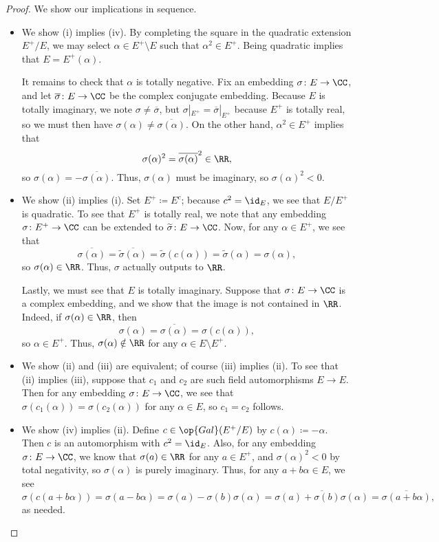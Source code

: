 \documentclass[../notes.tex]{subfiles}
\begin{document}
\begin{proof}
	We show our implications in sequence.
	\begin{itemize}
		\item We show (i) implies (iv). By completing the square in the quadratic extension $E^+/E$, we may select $\alpha\in E^+\setminus E$ such that $\alpha^2\in E^+$. Being quadratic implies that $E=E^+(\alpha)$.

		It remains to check that $\alpha$ is totally negative. Fix an embedding $\sigma\colon E\to\CC$, and let $\overline\sigma\colon E\to\CC$ be the complex conjugate embedding. Because $E$ is totally imaginary, we note $\sigma\ne\overline\sigma$, but $\sigma|_{E^+}=\overline\sigma|_{E^+}$ because $E^+$ is totally real, so we must then have $\sigma(\alpha)\ne\overline{\sigma(\alpha)}$. On the other hand, $\alpha^2\in E^+$ implies that
		\[\sigma(\alpha)^2=\overline{\sigma(\alpha)}^2\in\RR,\]
		so $\sigma(\alpha)=-\overline{\sigma(\alpha)}$. Thus, $\sigma(\alpha)$ must be imaginary, so $\sigma(\alpha)^2<0$.

		\item We show (ii) implies (i). Set $E^+\coloneqq E^c$; because $c^2=\id_E$, we see that $E/E^+$ is quadratic. To see that $E^+$ is totally real, we note that any embedding $\sigma\colon E^+\to\CC$ can be extended to $\widetilde\sigma\colon E\to\CC$. Now, for any $\alpha\in E^+$, we see that
		\[\overline{\sigma(\alpha)}=\overline{\widetilde\sigma(\alpha)}=\widetilde\sigma(c(\alpha))=\widetilde\sigma(\alpha)=\sigma(\alpha),\]
		so $\sigma(\alpha)\in\RR$. Thus, $\sigma$ actually outputs to $\RR$.

		Lastly, we must see that $E$ is totally imaginary. Suppose that $\sigma\colon E\to\CC$ is a complex embedding, and we show that the image is not contained in $\RR$. Indeed, if $\sigma(\alpha)\in\RR$, then
		\[\sigma(\alpha)=\overline{\sigma(\alpha)}=\sigma(c(\alpha)),\]
		so $\alpha\in E^+$. Thus, $\sigma(\alpha)\notin\RR$ for any $\alpha\in E\setminus E^+$.

		\item We show (ii) and (iii) are equivalent; of course (iii) implies (ii). To see that (ii) implies (iii), suppose that $c_1$ and $c_2$ are such field automorphisms $E\to E$. Then for any embedding $\sigma\colon E\to\CC$, we see that $\sigma(c_1(\alpha))=\sigma(c_2(\alpha))$ for any $\alpha\in E$, so $c_1=c_2$ follows.

		\item We show (iv) implies (ii). Define $c\in\op{Gal}(E^+/E)$ by $c(\alpha)\coloneqq-\alpha$. Then $c$ is an automorphism with $c^2=\id_E$. Also, for any embedding $\sigma\colon E\to\CC$, we know that $\sigma(a)\in\RR$ for any $a\in E^+$, and $\sigma(\alpha)^2<0$ by total negativity, so $\sigma(\alpha)$ is purely imaginary. Thus, for any $a+b\alpha\in E$, we see
		\[\sigma(c(a+b\alpha))=\sigma(a-b\alpha)=\sigma(a)-\sigma(b)\sigma(\alpha)=\overline{\sigma(a)+\sigma(b)\sigma(\alpha)}=\overline{\sigma(a+b\alpha)},\]
		as needed.
		\qedhere
	\end{itemize}
\end{proof}
\end{document}
